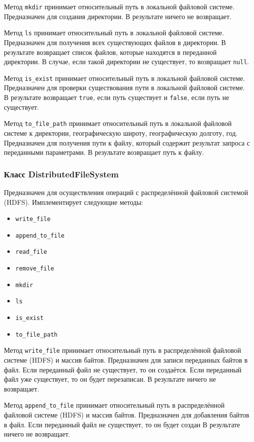 Метод \texttt{mkdir} принимает относительный путь в локальной файловой системе.
Предназначен для создания директории. 
В результате ничего не возвращает.

Метод \texttt{ls} принимает относительный путь в локальной файловой системе.
Предназначен для получения всех существующих файлов в директории.
В результате возвращает список файлов, которые находятся в переданной директории.
В случае, если такой директории не существует, то возвращает \texttt{null}.

Метод \texttt{is\_exist} принимает относительный путь в локальной файловой системе.
Предназначен для проверки существования пути в локальной файловой системе.
В результате возвращает \texttt{true}, если путь существует и \texttt{false}, если путь не существует.

Метод \texttt{to\_file\_path} принимает относительный путь в локальной файловой системе к директории, географическую широту, географическую долготу, год.
Предназначен для получения пути к файлу, который содержит результат запроса с переданными параметрами.
В результате возвращает путь к файлу.


\subsubsection{Класс DistributedFileSystem}
Предназначен для осуществления операций с распределённой файловой системой (HDFS).
Имплементирует следующие методы:
\begin{itemize}
    \item \texttt{write\_file}
    \item \texttt{append\_to\_file}
    \item \texttt{read\_file}
    \item \texttt{remove\_file}
    \item \texttt{mkdir}
    \item \texttt{ls}
    \item \texttt{is\_exist}
    \item \texttt{to\_file\_path}
\end{itemize}

Метод \texttt{write\_file} принимает относительный путь в распределённой файловой системе (HDFS) и массив байтов.
Предназначен для записи переданных байтов в файл.
Если переданный файл не существует, то он создаётся.
Если переданный файл уже существует, то он будет перезаписан.
В результате ничего не возвращает.

Метод \texttt{append\_to\_file} принимает относительный путь в распределённой файловой системе (HDFS) и массив байтов.
Предназначен для добавления байтов в файл.
Если переданный файл не существует, то он будет создан
В результате ничего не возвращает.

